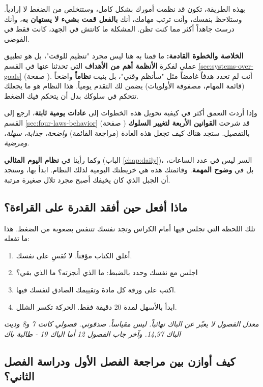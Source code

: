 \documentclass[12pt,a4paper]{book}
\newcommand{\quoteAr}[1]{%
	\begin{myquote}
		\itshape #1
	\end{myquote}
}
\begin{document}
	بهذه الطريقة، تكون قد نظمت أمورك بشكل كامل، وستتخلص من الضغط لا إرادياً. وستلاحظ بنفسك، وأنت ترتب مهامك، أنك \textbf{بالفعل قمت بشيء لا يستهان به}، وأنك درست جاهداً أكثر مما كنت تظن. المشكلة ما كانتش في الجهد، كانت فقط في الفوضى.
	
	\vspace{1em}
	\textbf{الخلاصة والخطوة القادمة:}
	ما قمنا به هنا ليس مجرد "تنظيم للوقت"، بل هو تطبيق عملي لفكرة \textbf{الأنظمة أهم من الأهداف} التي تحدثنا عنها في القسم \ref{sec:systems-over-goals} (صفحة \pageref{sec:systems-over-goals}). أنت لم تحدد هدفاً غامضاً مثل "سأنظم وقتي"، بل بنيت \textbf{نظاماً} واضحاً (قائمة المهام، مصفوفة الأولويات) يضمن لك التقدم يومياً. هذا النظام هو ما يجعلك تتحكم في سلوكك بدل أن يتحكم فيك الضغط.
	
	وإذا أردت التعمق أكثر في كيفية تحويل هذه الخطوات إلى \textbf{عادات يومية ثابتة}، ارجع إلى القسم \ref{sec:four-laws-behavior} (صفحة \pageref{sec:four-laws-behavior}) قد شرحت \textbf{القوانين الأربعة لتغيير السلوك} بالتفصيل. ستجد هناك كيف تجعل هذه العادة (مراجعة القائمة) \textit{واضحة، جذابة، سهلة، ومرضية}.
	
	وكما رأينا في \textbf{نظام اليوم المثالي} (الباب \ref{chap:daily})، السر ليس في عدد الساعات، بل في \textbf{وضوح المهمة}. وقائمتك هذه هي خريطتك اليومية لذلك النظام. ابدأ بها، وستجد أن الجبل الذي كان يخيفك أصبح مجرد تلال صغيرة مرتبة.
	\subsection*{ماذا أفعل حين أفقد القدرة على القراءة؟}
	
	تلك اللحظة التي تجلس فيها أمام الكراس وتجد نفسك تتنفس بصعوبة من الضغط. هذا ما تفعله:
	
	\begin{enumerate}
		\item أغلق الكتاب مؤقتاً. لا تُقسِ على نفسك.
		\item اجلس مع نفسك وحدد بالضبط: ما الذي أنجزته؟ ما الذي بقي؟
		\item اكتب على ورقة كل مادة وتقييمك الصادق لنفسك فيها.
		\item ابدأ بالأسهل لمدة 20 دقيقة فقط. الحركة تكسر الشلل.
	\end{enumerate}
	
	\quoteAr{معدل الفصول لا يعبّر عن الباك نهائياً. ليس مقياساً. صدقوني. فصولي كانت 7 و8 وديت الباك 14,97. وآخر جاب الفصول 12 أما الباك 19 - طالبة باك}
	
	\subsection*{كيف أوازن بين مراجعة الفصل الأول ودراسة الفصل الثاني؟}
	\label{sec:balance-semesters}
	
\end{document}
